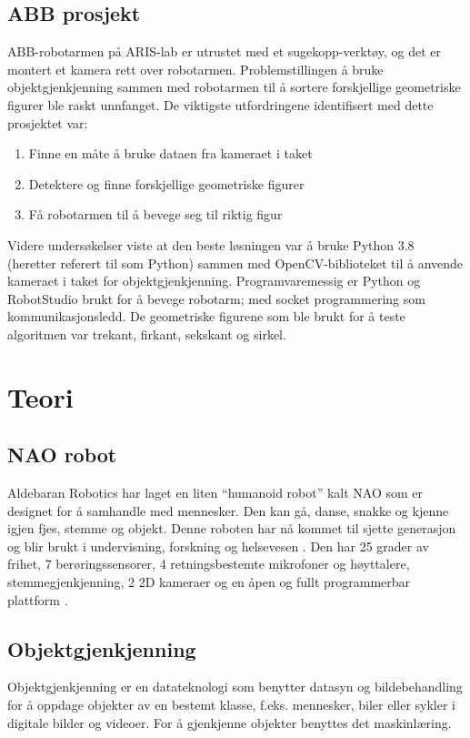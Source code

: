 \documentclass[conference]{IEEEtran}
\begin{document}
    \subsection{ABB prosjekt}
    ABB-robotarmen på ARIS-lab er utrustet med et sugekopp-verktøy, og det er montert et kamera rett over robotarmen. Problemstillingen å bruke 
    objektgjenkjenning sammen med robotarmen til å sortere forskjellige geometriske figurer ble raskt unnfanget. De viktigste utfordringene identifisert 
    med dette prosjektet var:
        \begin{enumerate}
            \item Finne en måte å bruke dataen fra kameraet i taket
            \item Detektere og finne forskjellige geometriske figurer
            \item Få robotarmen til å bevege seg til riktig figur
        \end{enumerate}
        Videre undersøkelser viste at den beste løsningen var å bruke Python 3.8 (heretter referert til som Python) sammen med OpenCV-biblioteket til å 
        anvende kameraet i taket for objektgjenkjenning. Programvaremessig er Python og RobotStudio brukt for å bevege robotarm; med socket programmering 
        som kommunikasjonsledd. De geometriske figurene som ble brukt for å teste algoritmen var trekant, firkant, sekskant og sirkel.

\section{Teori}

    \subsection{NAO robot}
        Aldebaran Robotics har laget en liten “humanoid robot” kalt NAO som er designet for å samhandle med mennesker. Den kan gå, danse, snakke og kjenne 
        igjen fjes, stemme og objekt. Denne roboten har nå kommet til sjette generasjon og blir brukt i undervisning, forskning og helsevesen \cite{teori:NAO}. 
        Den har 25 grader av frihet, 7 berøringssensorer, 4 retningsbestemte mikrofoner og høyttalere, stemmegjenkjenning, 2 2D kameraer og en åpen 
        og fullt programmerbar plattform \cite{teori:SBNAO}.

    \subsection{Objektgjenkjenning}
        Objektgjenkjenning er en datateknologi som benytter datasyn og bildebehandling for å oppdage objekter av en bestemt klasse, f.eks. 
        mennesker, biler eller sykler i digitale bilder og videoer. For å gjenkjenne objekter benyttes det maskinlæring. 
\end{document}
